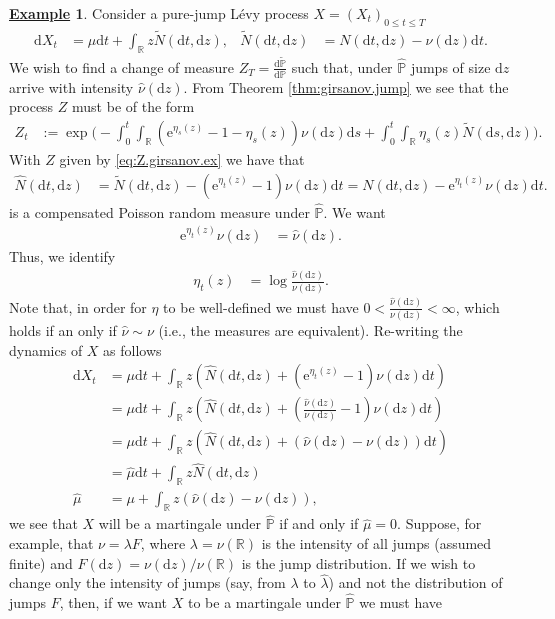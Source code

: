 \documentclass[12pt]{book}
\numberwithin{equation}{chapter}
\theoremstyle{plain}
\numberwithin{theorem}{section}
\theoremstyle{definition}
\newtheorem{example}[theorem]{\underline{Example}}
\numberwithin{exercise}{chapter}
\newcommand{\<}{\langle}
\renewcommand{\>}{\rangle}
\renewcommand{\(}{\left(}
\renewcommand{\)}{\right)}
\renewcommand{\[}{\left[}
\renewcommand{\]}{\right]}
\newcommand\Pb{\mathds{P}}
\newcommand\Rb{\mathds{R}}
\newcommand\lam{\lambda}
\newcommand\Pbh{\widehat{\Pb}}
\newcommand\Nh{\widehat{N}}
\newcommand\nuh{\widehat{\nu}}
\newcommand\muh{\widehat{\mu}}
\newcommand\lamh{\widehat{\lam}}
\newcommand\Pbt{\widetilde{\Pb}}
\newcommand\Nt{\widetilde{N}}
\newcommand\dd{\mathrm{d}}
\newcommand\ee{\mathrm{e}}
\begin{document}
\begin{example}
Consider a pure-jump L\'evy process $X=(X_t)_{0 \leq t \leq T}$
\begin{align}
\dd X_t
	&=	\mu \dd t + \int_\Rb z \Nt( \dd t, \dd z ) , &
\Nt( \dd t, \dd z)
	&=	N( \dd t, \dd z) - \nu( \dd z ) \dd t .
\end{align}
We wish to find a change of measure $Z_T = \frac{\dd \Pbt}{\dd \Pb}$ such that, under $\Pbh$ jumps of size $\dd z$ arrive with intensity $\nuh(\dd z)$.
From Theorem \ref{thm:girsanov.jump} we see that the process $Z$ must be of the form
\begin{align}
Z_t
	&:=	\exp \Big( - \int_0^t \int_\Rb \( \ee^{\eta_s(z)} - 1 - \eta_s(z) \) \nu(\dd z) \dd s + \int_0^t \int_\Rb \eta_s(z) \Nt(\dd s , \dd z) \Big) .
	\label{eq:Z.girsanov.ex}
\end{align}
With $Z$ given by \eqref{eq:Z.girsanov.ex} we have that
\begin{align}
\Nh( \dd t, \dd z)
	&=	\Nt( \dd t , \dd z) -\( \ee^{\eta_t(z)} - 1\)\nu(\dd z) \dd t
	=	N( \dd t , \dd z ) - \ee^{\eta_t(z)} \nu(\dd z) \dd t . \label{eq:N.hat.ex}
\end{align}
is a compensated Poisson random measure under $\Pbh$.  We want
\begin{align}
\ee^{\eta_t(z)} \nu(\dd z)
	&=	\nuh(\dd z) .
\end{align}
Thus, we identify
\begin{align}
\eta_t(z)
	&=	\log \frac{\nuh(\dd z)}{\nu(\dd z)} .
\end{align}
Note that, in order for $\eta$ to be well-defined we must have $0 < \frac{\nuh(\dd z)}{\nu(\dd z)} < \infty$, which holds if an only if $\nuh \sim \nu$ (i.e., the measures are equivalent).
Re-writing the dynamics of $X$ as follows
\begin{align}
\dd X_t
	&=	\mu \dd t + \int_\Rb z \( \Nh( \dd t, \dd z ) + \( \ee^{\eta_t(z)} - 1\) \nu(\dd z) \dd t \) \\
	&=	\mu \dd t + \int_\Rb z \( \Nh( \dd t, \dd z ) + \( \frac{\nuh(\dd z)}{\nu(\dd z)} - 1\) \nu(\dd z) \dd t \) \\
	&=	\mu \dd t + \int_\Rb z \( \Nh( \dd t, \dd z ) + \( \nuh(\dd z) - \nu(\dd z) \) \dd t \) \\
	&=	\muh \dd t + \int_\Rb z \Nh( \dd t, \dd z ) \\
\muh
	&=	\mu + \int_\Rb z \( \nuh(\dd z) - \nu(\dd z) \) ,
\end{align}
we see that $X$ will be a martingale under $\Pbh$ if and only if $\muh = 0$.  Suppose, for example, that $\nu = \lam F$, where $\lam = \nu(\Rb)$ is the intensity of all jumps (assumed finite) and $F(\dd z) = \nu(\dd z)/\nu(\Rb)$ is the jump distribution.  If  we wish to change only the intensity of jumps (say, from $\lam$ to $\lamh$) and not the distribution of jumps $F$, then, if we want $X$ to be a martingale under $\Pbh$ we must have

\end{example}
\end{document}
